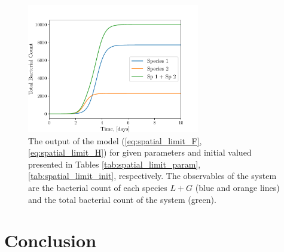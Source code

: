 \documentclass[10pt,A4paper]{article}
\begin{document}
\begin{figure}[H]
    \begin{center}
    \includegraphics[width=0.67\textwidth]{Figures/pool_model_spatial.pdf}
    \caption{{\footnotesize The output of the model (\ref{eq:spatial_limit_F}, \ref{eq:spatial_limit_H}) for given parameters and initial valued presented in Tables \ref{tab:spatial_limit_param}, \ref{tab:spatial_limit_init}, respectively.
    The observables of the system are the bacterial count of each species $L+G$ (blue and orange lines) and the total bacterial count of the system (green).}}
    \label{fig:spatial_limit_plot1}
    \end{center}
\end{figure}



\section{Conclusion}

\newpage
\printbibliography
\end{document}

